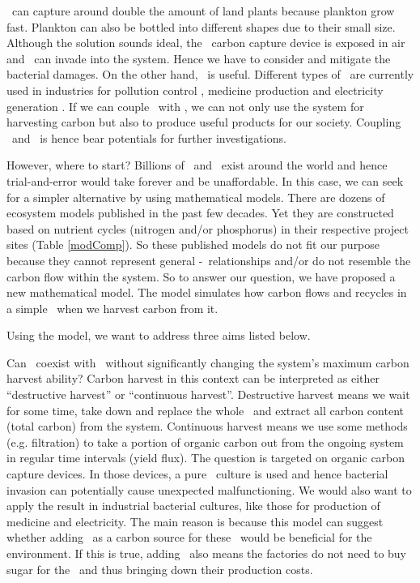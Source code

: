 \documentclass[../thesis.tex]{subfiles} %
\begin{document}
\Phy\ can capture around double the amount of land plants \autocite{SCHLESINGER2013341} because plankton grow fast.  Plankton can also be bottled into different shapes \autocite{evanson_2019} due to their small size.  Although the solution sounds ideal, the \phy\ carbon capture device is exposed in air and \bac\ can invade into the system.  Hence we have to consider and mitigate the bacterial damages.  On the other hand, \bac\ is useful.  Different types of \bac\ are currently used in industries for pollution control \autocite{dash2013marine,naik2013lead}, medicine production \autocite{huang2012industrial} and electricity generation \autocite{songera2012electricity}.  If we can couple \phy\ with \bac, we can not only use the system for harvesting carbon but also to produce useful products for our society.  Coupling \phy\ and \bac\ is hence bear potentials for further investigations.

However, where to start?  Billions of \phy\ and \bac\ exist around the world and hence trial-and-error would take forever and be unaffordable.  In this case, we can seek for a simpler alternative by using mathematical models.  There are dozens of ecosystem models published in the past few decades.  Yet they are constructed based on nutrient cycles (nitrogen and/or phosphorus) in their respective project sites (Table \ref{modComp}).  So these published models do not fit our purpose because they cannot represent general \phy-\bac\ relationships and/or do not resemble the carbon flow within the system.  So to answer our question, we have proposed a new mathematical model.  The model simulates how carbon flows and recycles in a simple \pbs\ when we harvest carbon from it.

Using the model, we want to address three aims listed below.

Can \bac\ coexist with \phy\ without significantly changing the system’s maximum carbon harvest ability?  Carbon harvest in this context can be interpreted as either ``destructive harvest” or ``continuous harvest”.  Destructive harvest means we wait for some time, take down and replace the whole \pbs\ and extract all carbon content (total carbon) from the system.  Continuous harvest means we use some methods (e.g. filtration) to take a portion of organic carbon out from the ongoing system in regular time intervals (yield flux).  The question is targeted on organic carbon capture devices.  In those devices, a pure \phy\ culture is used \autocite{evanson_2019} and hence bacterial invasion can potentially cause unexpected malfunctioning.  We would also want to apply the result in industrial bacterial cultures, like those for production of medicine and electricity.  The main reason is because this model can suggest whether adding \phy\ as a carbon source for these \bac\ would be beneficial for the environment.  If this is true, adding \phy\ also means the factories do not need to buy sugar for the \bac\ and thus bringing down their production costs.
\end{document}
